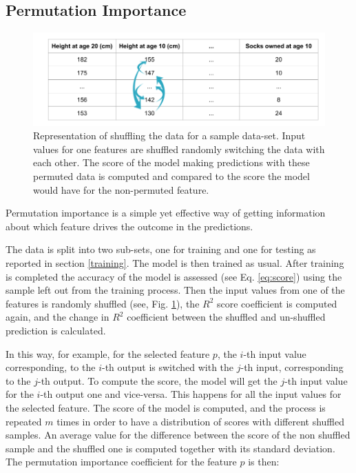 \subsection{Permutation Importance}\label{permutation}

\begin{figure}[!tp]
	\centering		  
	\includegraphics[width=1.\textwidth]{figures/permutation.png}
	\caption{Representation of shuffling the data for a sample data-set. Input values for one features are shuffled randomly switching the data with each other. The score of the model making predictions with these permuted data is computed and compared to the score the model would have for the non-permuted feature.}
	\label{fig:permutation}
\end{figure}

Permutation importance is a simple yet effective way of getting information about which feature drives the outcome in the predictions. 

The data is split into two sub-sets, one for training and one for testing as reported in section \ref{training}. The model is then trained as usual. After training is completed the accuracy of the model is assessed (see Eq. \ref{eq:score}) using the sample left out from the training process. Then the input values from one of the features is randomly shuffled (see, Fig. \ref{fig:permutation}), the $R^2$ score coefficient is computed again, and the change in $R^2$ coefficient between the shuffled and un-shuffled prediction is calculated. 

In this way, for example, for the selected feature $p$, the $i$-th input value corresponding, to the $i$-th output is switched with the $j$-th input, corresponding to the $j$-th output. To compute the score, the model will get the $j$-th input value for the $i$-th output one and vice-versa. This happens for all the input values for the selected feature. The score of the model is computed, and the process is repeated $m$ times in order to have a distribution of scores with different shuffled samples. An average value for the difference between the score of the non shuffled sample and the shuffled one is computed together with its standard deviation.
The permutation importance coefficient for the feature $p$ is then:


